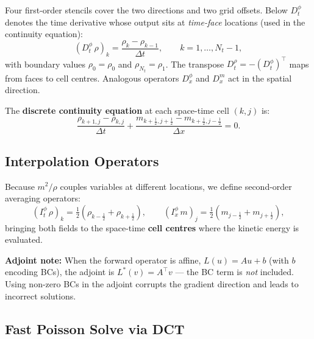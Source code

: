 \documentclass[11pt]{article}
\newcommand{\rhoO}{\rho_0}
\newcommand{\rhoT}{\rho_1}
\begin{document}
Four first-order stencils cover the two directions and two grid offsets.
Below $D_t^\phi$ denotes the time derivative whose output sits at
\emph{time-face} locations (used in the continuity equation):
%
\begin{equation}
  (D_t^\phi\,\rho)_{k} = \frac{\rho_{k} - \rho_{k-1}}{\Delta t},
  \qquad k=1,\ldots,N_t-1,
\end{equation}
%
with boundary values $\rho_0 = \rhoO$ and $\rho_{N_t} = \rhoT$.
The transpose $D_t^\rho = -(D_t^\phi)^\top$ maps from faces to cell centres.
Analogous operators $D_x^\phi$ and $D_x^m$ act in the spatial direction.

The \textbf{discrete continuity equation} at each space-time cell $(k,j)$ is:
\begin{equation}\label{eq:disc_cont}
  \frac{\rho_{k+1,j} - \rho_{k,j}}{\Delta t}
  + \frac{m_{k+\frac{1}{2},j+\frac{1}{2}} - m_{k+\frac{1}{2},j-\frac{1}{2}}}{\Delta x} = 0.
\end{equation}

\subsection{Interpolation Operators}

Because $m^2/\rho$ couples variables at different locations, we define
second-order averaging operators:
%
\begin{equation}
  (I_t^\phi\,\rho)_k = \tfrac{1}{2}(\rho_{k-\frac{1}{2}} + \rho_{k+\frac{1}{2}}),
  \qquad
  (I_x^\phi\,m)_j = \tfrac{1}{2}(m_{j-\frac{1}{2}} + m_{j+\frac{1}{2}}),
\end{equation}
%
bringing both fields to the space-time \textbf{cell centres} where the
kinetic energy is evaluated.

\textbf{Adjoint note:} When the forward operator is affine,
$L(u) = Au + b$ (with $b$ encoding BCs), the adjoint is $L^*(v)=A^\top v$
--- the BC term is \emph{not} included. Using non-zero BCs in the adjoint
corrupts the gradient direction and leads to incorrect solutions.

\subsection{Fast Poisson Solve via DCT}
\end{document}
